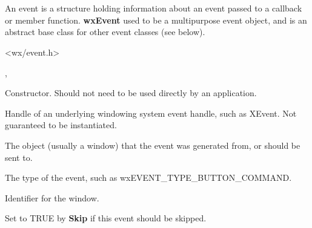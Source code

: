 \section{}\label{wxevent}

An event is a structure holding information about an event passed to a
callback or member function. {\bf wxEvent} used to be a multipurpose
event object, and is an abstract base class for other event classes (see below).




<wx/event.h>


,\rtfsp
{}




Constructor. Should not need to be used directly by an application.



Handle of an underlying windowing system event handle, such as
XEvent. Not guaranteed to be instantiated.



The object (usually a window) that the event was generated from,
or should be sent to.



The type of the event, such as wxEVENT\_TYPE\_BUTTON\_COMMAND.



Identifier for the window.



Set to TRUE by {\bf Skip} if this event should be skipped.



